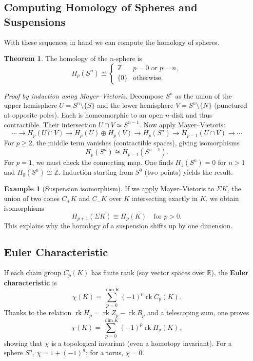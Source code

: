 \documentclass{article}
\theoremstyle{definition}
\newtheorem{example}{Example}[section]
\newtheorem{theorem}{Theorem}[section]
\begin{document}
\subsection{Computing Homology of Spheres and Suspensions}
With these sequences in hand we can compute the homology of spheres.

\begin{theorem}
The homology of the $n$-sphere is
\[
H_p(S^n) \cong \begin{cases}
\mathbb{Z} & p = 0 \text{ or } p = n,\\
\{0\} & \text{otherwise}.
\end{cases}
\]
\end{theorem}

\textit{Proof by induction using Mayer–Vietoris.}
Decompose $S^n$ as the union of the upper hemisphere $U = S^n\setminus\{S\}$ and the lower hemisphere $V = S^n\setminus\{N\}$ (punctured at opposite poles). Each is homeomorphic to an open $n$-disk and thus contractible. Their intersection $U\cap V \simeq S^{n-1}$.
Now apply Mayer–Vietoris:
\[
\cdots \to H_p(U\cap V) \to H_p(U)\oplus H_p(V) \to H_p(S^n) \to H_{p-1}(U\cap V) \to \cdots
\]
For $p\ge 2$, the middle term vanishes (contractible spaces), giving isomorphisms
\[
H_p(S^n) \cong H_{p-1}(S^{n-1}).
\]
For $p=1$, we must check the connecting map. One finds $H_1(S^n)=0$ for $n>1$ and $H_0(S^n)\cong \mathbb{Z}$. Induction starting from $S^0$ (two points) yields the result.

\begin{example}[Suspension isomorphism]
If we apply Mayer–Vietoris to $\Sigma K$, the union of two cones $C_+K$ and $C_-K$ over $K$ intersecting exactly in $K$, we obtain isomorphisms
\[
H_{p+1}(\Sigma K) \cong H_p(K) \quad \text{for } p>0.
\]
This explains why the homology of a suspension shifts up by one dimension.
\end{example}

\subsection{Euler Characteristic}
If each chain group $C_p(K)$ has finite rank (say vector spaces over $\mathbb{R}$), the \textbf{Euler characteristic} is
\[
\chi(K) = \sum_{p=0}^{\dim K} (-1)^p \operatorname{rk} C_p(K).
\]
Thanks to the relation $\operatorname{rk} H_p = \operatorname{rk} Z_p - \operatorname{rk} B_p$ and a telescoping sum, one proves
\[
\chi(K) = \sum_{p=0}^{\dim K} (-1)^p \operatorname{rk} H_p(K),
\]
showing that $\chi$ is a topological invariant (even a homotopy invariant). For a sphere $S^n$, $\chi = 1+(-1)^n$; for a torus, $\chi = 0$.
\end{document}
